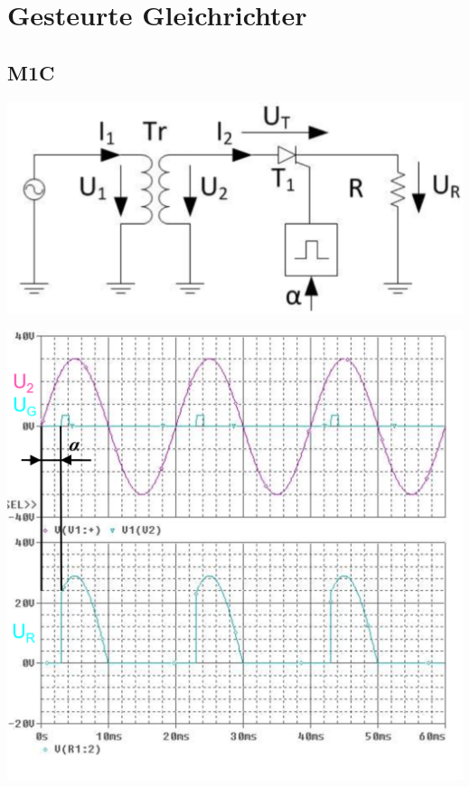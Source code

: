 \section{Gesteurte Gleichrichter}
\subsection{M1C}
\vspace{-0.5cm}
\begin{minipage}{0.4\linewidth}
    \includegraphics[width=0.8\linewidth]{images/GRM1c}
\end{minipage}
\begin{minipage}{0.35\linewidth}
    \centering %
    \includegraphics[width=0.8\linewidth]{images/M1CKl}

\end{minipage}
